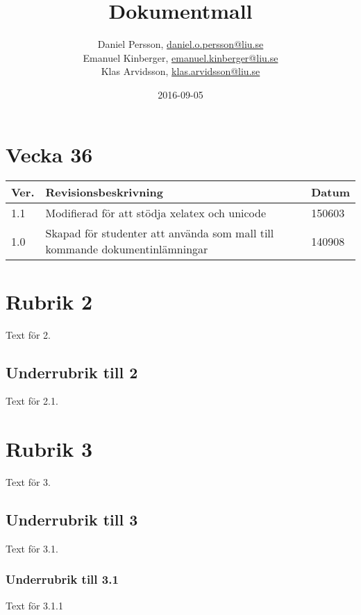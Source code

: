 \documentclass{TDP003mall}
\author{Daniel Persson, \url{daniel.o.persson@liu.se}\\
  Emanuel Kinberger, \url{emanuel.kinberger@liu.se}\\
  Klas Arvidsson, \url{klas.arvidsson@liu.se}}
\title{Dokumentmall}
\date{2016-09-05}
\begin{document}
\projectpage
\section{Vecka 36}
\begin{table}[!h]
\begin{tabularx}{\linewidth}{|l|X|l|}
\hline
Ver. & Revisionsbeskrivning & Datum \\\hline
1.1 & Modifierad för att stödja xelatex och unicode & 150603 \\\hline
1.0 & Skapad för studenter att använda som mall till
kommande dokumentinlämningar & 140908 \\\hline
\end{tabularx}
\end{table}


\section{Rubrik 2}
Text för 2.

\subsection{Underrubrik till 2}
Text för 2.1.

\section{Rubrik 3}
Text för 3.

\subsection{Underrubrik till 3}
Text för 3.1.

\subsubsection{Underrubrik till 3.1}
Text för 3.1.1
\end{document}
